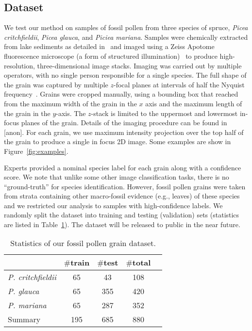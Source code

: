 \documentclass[10pt,twocolumn,letterpaper]{article}
\begin{document}
\subsection{Dataset}

We test our method on samples of fossil pollen from three species of spruce,
\emph{Picea critchfieldii}, \emph{Picea glauca}, and \emph{Piciea mariana}.
Samples were chemically extracted from lake sediments as detailed in~\cite{punyasena2012classifying,mander2014identifying}
and imaged using a Zeiss Apotome fluorescence microscope (a form of
structured illumination)~\cite{weigel2009resolution} to produce
high-resolution, three-dimensional image stacks.
Imaging was carried out by multiple operators, with no single person responsible for a single species.
The full shape of the grain was captured by multiple $z$-focal planes at intervals of half the Nyquist frequency~\cite{punyasena2012classifying}.
Grains were cropped manually, using a bounding box that reached from the
maximum width of the grain in the $x$ axis and the maximum length of the grain
in the $y$-axis. The $z$-stack is limited to the uppermost and lowermost
in-focus planes of the grain.
Details of the imaging procedure can be found in [anon].
For each grain, we use maximum intensity projection over the top half of the
grain to produce a single in focus 2D image.  Some examples are show in
Figure~\ref{fig:examples}.

Experts provided a nominal species label for each grain along with a confidence
score. We note that unlike some other image classification tasks, there is no
``ground-truth'' for species identification. However, fossil pollen grains were
taken from strata containing other macro-fossil evidence (e.g., leaves) of
these species and we restricted our analysis to samples with high-confidence
labels.  We randomly split the dataset into training and testing (validation)
sets (statistics are listed in Table~\ref{tab:Dataset}).  The dataset will be
released to public in the near future.

\begin{table}[t]
\footnotesize
\centering
\caption{Statistics of our fossil pollen grain dataset.}
\begin{tabular}{|l|c|c|c|c|}
\hline
                        &	$\#$train &		$\#$test & $\#$total          \\
\hline
\emph{P. critchfieldii} &65            &43  & 108       \\
\emph{P. glauca}        &65            &355 & 420       \\
\emph{P. mariana}       &65            &287 & 352       \\
\hline
Summary                 &195           &685 & 880       \\
\hline
\end{tabular}
\label{tab:Dataset}
\vspace{-5mm}
\end{table}
\end{document}
